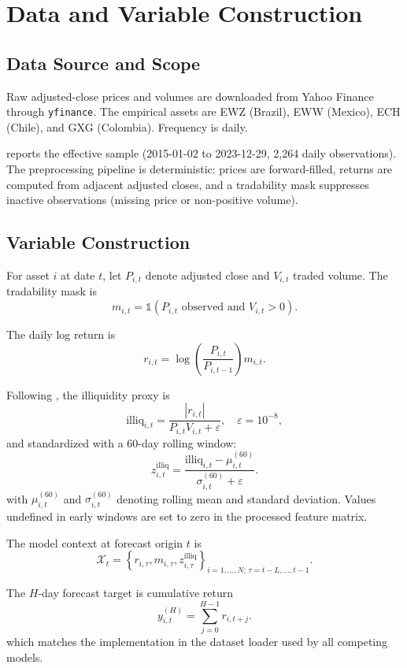\section{Data and Variable Construction}

\subsection{Data Source and Scope}
Raw adjusted-close prices and volumes are downloaded from Yahoo Finance through \texttt{yfinance}. The empirical assets are EWZ (Brazil), EWW (Mexico), ECH (Chile), and GXG (Colombia). Frequency is daily.



 reports the effective sample (2015-01-02 to 2023-12-29, 2,264 daily observations). The preprocessing pipeline is deterministic: prices are forward-filled, returns are computed from adjacent adjusted closes, and a tradability mask suppresses inactive observations (missing price or non-positive volume).

\subsection{Variable Construction}
For asset $i$ at date $t$, let $P_{i,t}$ denote adjusted close and $V_{i,t}$ traded volume. The tradability mask is
\begin{equation}
m_{i,t} = \mathbb{1}\!\left(P_{i,t}\text{ observed and }V_{i,t}>0\right).
\label{eq:mask}
\end{equation}

The daily log return is
\begin{equation}
r_{i,t} = \log\!\left(\frac{P_{i,t}}{P_{i,t-1}}\right)m_{i,t}.
\label{eq:return}
\end{equation}

Following \textcite{amihud2002}, the illiquidity proxy is
\begin{equation}
\text{illiq}_{i,t} = \frac{|r_{i,t}|}{P_{i,t}V_{i,t}+\varepsilon}, \quad \varepsilon=10^{-8},
\label{eq:amihud}
\end{equation}
and standardized with a 60-day rolling window:
\begin{equation}
z^{\text{illiq}}_{i,t} = \frac{\text{illiq}_{i,t}-\mu_{i,t}^{(60)}}{\sigma_{i,t}^{(60)}+\varepsilon}.
\label{eq:amihud-z}
\end{equation}
with \(\mu_{i,t}^{(60)}\) and \(\sigma_{i,t}^{(60)}\) denoting rolling mean and standard deviation. Values undefined in early windows are set to zero in the processed feature matrix.

The model context at forecast origin $t$ is
\begin{equation}
\mathcal{X}_{t}=\left\{r_{i,\tau},m_{i,\tau},z^{\text{illiq}}_{i,\tau}\right\}_{i=1,\ldots,N;\,\tau=t-L,\ldots,t-1}.
\label{eq:context}
\end{equation}

The $H$-day forecast target is cumulative return
\begin{equation}
y^{(H)}_{i,t} = \sum_{j=0}^{H-1} r_{i,t+j}.
\label{eq:target}
\end{equation}
which matches the implementation in the dataset loader used by all competing models.
